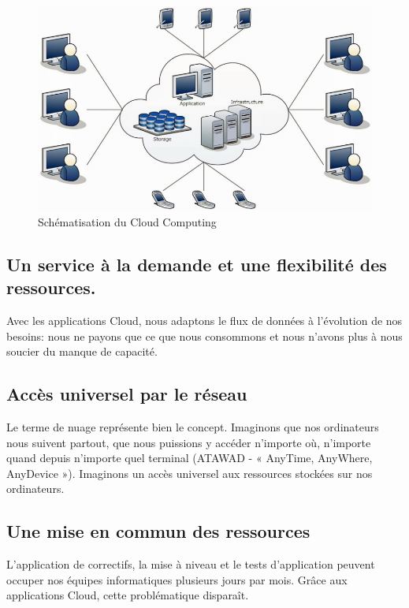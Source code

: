   \begin{figure}
    \begin{center}
      \includegraphics[scale=0.3]{images/CloudComputing.png}
    \end{center}
    \caption{Schématisation du Cloud Computing}
    \label{Cloud Computing}
  \end{figure}

  \subsection{Un service à la demande et une flexibilité des ressources.}
  Avec les applications Cloud, nous adaptons le flux de données à l'évolution de nos besoins: nous ne payons que ce que nous consommons et nous n'avons plus à nous soucier du manque de capacité.

  \subsection{Accès universel par le réseau}
  Le terme de nuage représente bien le concept. Imaginons que nos ordinateurs nous suivent partout, que nous puissions y accéder n’importe où, n’importe quand depuis n’importe quel terminal (ATAWAD - « AnyTime, AnyWhere, AnyDevice »). Imaginons un accès universel aux ressources stockées sur nos ordinateurs.

  \subsection{Une mise en commun des ressources}
  L'application de correctifs, la mise à niveau et le tests d'application peuvent occuper nos équipes informatiques plusieurs jours par mois. Grâce aux applications Cloud, cette problématique disparaît.\\

